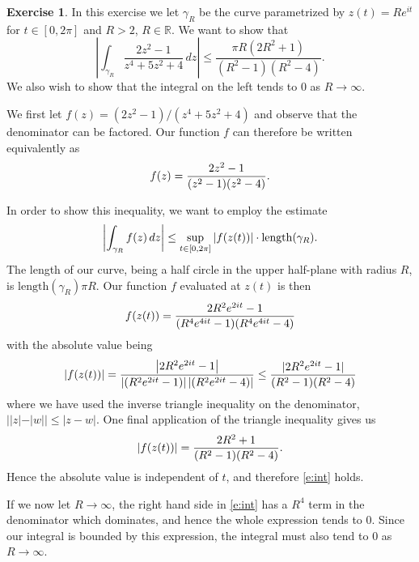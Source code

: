 \documentclass[a4paper]{amsart}
\newcommand{\R}{\mathbb{R}}
\theoremstyle{definition}
\newtheorem{exercise}{Exercise}
\begin{document}
\begin{exercise}
  In this exercise we let $\gamma_R$ be the curve parametrized by $z(t) =
  Re^{it}$ for $t \in [0, 2\pi]$ and $R > 2$, $R \in \R$.  We want to show that
  \begin{equation}
    \label{e:int}
    \left| \int_{\gamma_R} \frac{2z^2 - 1}{z^4 + 5z^2 + 4}\, dz \right| \leq \frac{\pi R(2R^2 + 1)}{(R^2 - 1)(R^2-4)}.
  \end{equation}
  We also wish to show that the integral on the left tends to 0 as $R \to
  \infty$.

We first let $f(z) = (2z^2 - 1)/(z^4 + 5z^2 + 4)$ and observe that the
denominator can be factored. Our function $f$ can therefore be written
equivalently
  as \begin{equation}
    \notag
    f(z) = \frac{2z^2 - 1}{(z^2 - 1)(z^2 -4)}.
  \end{equation}
  
  In order to show this inequality, we want to employ the estimate
  \begin{equation}
    \notag
    \left| \int_{\gamma_R} f(z) \, dz \right| \leq \sup_{t \in [0, 2\pi]} \left| f(z(t)) \right| \cdot \mathrm{length}(\gamma_R).
  \end{equation}
  The length of our curve, being a half circle in the upper half-plane with
  radius $R$, is $\mathrm{length}(\gamma_R) \pi R$.  Our function $f$ evaluated
  at $z(t)$ is then
  \begin{equation}
    \notag
    f(z(t)) = \frac{2R^2e^{2it} - 1}{(R^4e^{4it} - 1)(R^4e^{4it} - 4)}
  \end{equation}
  with the absolute value being
  \begin{equation}
    \notag
    |f(z(t))| = \frac{\left|2R^2e^{2it} - 1\right|}{\left|(R^2e^{2it} - 1)\right|\left|(R^2e^{2it} - 4)\right|} \leq \frac{|2R^2e^{2it} - 1|}{(R^2 - 1)(R^2 - 4)}
  \end{equation}
  where we have used the inverse triangle inequality on the denominator,
  ${||z|-|w|| \leq |z - w|}$. One final application of the triangle inequality
  gives us
  \begin{equation}
    \notag
    |f(z(t))| = \frac{2R^2 + 1}{(R^2 - 1)(R^2 - 4)}.
  \end{equation}
  Hence the absolute value is independent of $t$, and therefore \cref{e:int}
  holds.

  If we now let $R \to \infty$, the right hand side in \cref{e:int} has a $R^4$
  term in the denominator which dominates, and hence the whole expression tends
  to $0$. Since our integral is bounded by this expression, the integral must
  also tend to $0$ as $R \to \infty$.
\end{exercise}
\end{document}
